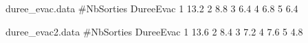 \begin{filecontents}{duree_evac.data}
#NbSorties	DureeEvac
1	13.2
2	8.8
3	6.4
4	6.8
5	6.4
\end{filecontents}

\begin{filecontents}{duree_evac2.data}
#NbSorties 	DureeEvac
1	13.6
2	8.4
3	7.2
4	7.6
5	4.8
\end{filecontents}